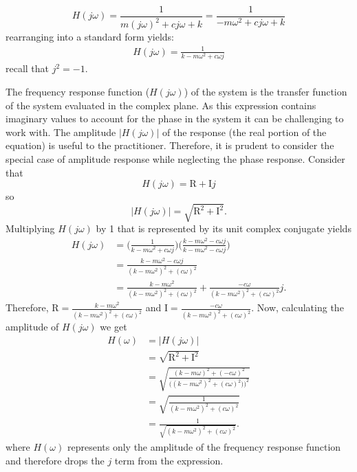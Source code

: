 \documentclass[12pt,letter]{article}
\begin{document}
\begin{equation}
H(j\omega) = \frac{1}{m(j\omega)^2+cj\omega+k} = \frac{1}{-m\omega^2+cj\omega+k} 
\end{equation}
rearranging into a standard form yields:
\begin{eqnarray}
H(j\omega) = \frac{1}{k-m\omega^2+c\omega j}
\label{eq:frequency_response_function}
\end{eqnarray}
recall that $j^2=-1$. 


The frequency response function ($H(j\omega)$) of the system is the transfer function of the system evaluated in the complex plane.
As this expression contains imaginary values to account for the phase in the system it can be challenging to work with. The amplitude $|H(j\omega)|$ of the response (the real portion of the equation) is useful to the practitioner. Therefore, it is prudent to consider the special case of amplitude response while neglecting the phase response. Consider that
\begin{equation}
	H(j\omega) = \text{R}+\text{I}j
\end{equation}  
so
\begin{equation}
	 |H(j\omega)|=\sqrt{\text{R}^2+\text{I}^2}.
\end{equation}  
Multiplying $H(j\omega)$ by 1 that is represented by its unit complex conjugate yields
\begin{align}
H(j\omega) &= \bigg( \frac{1}{k-m\omega^2+c\omega j} \bigg) \bigg( \frac{k-m\omega^2-c\omega j}{k-m\omega^2-c\omega j}\bigg) \\
&= \frac{k-m\omega^2-c\omega j}{(k-m\omega^2)^2 + (c\omega)^2}  \\
&=  \frac{k-m\omega^2}{(k-m\omega^2)^2 + (c\omega)^2}  +  \frac{-c\omega}{(k-m\omega^2)^2 + (c\omega)^2}j.
\end{align}
Therefore, $\text{R} = \frac{k-m\omega^2}{(k-m\omega^2)^2 + (c\omega)^2} $ and $\text{I} = \frac{-c\omega}{(k-m\omega^2)^2 + (c\omega)^2}$. Now, calculating the amplitude of $H(j\omega)$ we get
\begin{align}
H(\omega) &= |H(j\omega)| \\
&=  \sqrt{\text{R}^2+\text{I}^2} \\
&=  \sqrt{\frac{(k-m\omega)^2+(-c\omega)^2}{\big((k-m\omega^2)^2+(c\omega)^2)\big)^2}} \\
&=  \sqrt{\frac{1}{(k-m\omega^2)^2+(c\omega)^2}} \\
&= \frac{1}{\sqrt{(k-m\omega^2)^2+(c\omega)^2}}.
\end{align}
where $H(\omega)$ represents only the amplitude of the frequency response function and therefore drops the $j$ term from the expression. 
\end{document}
